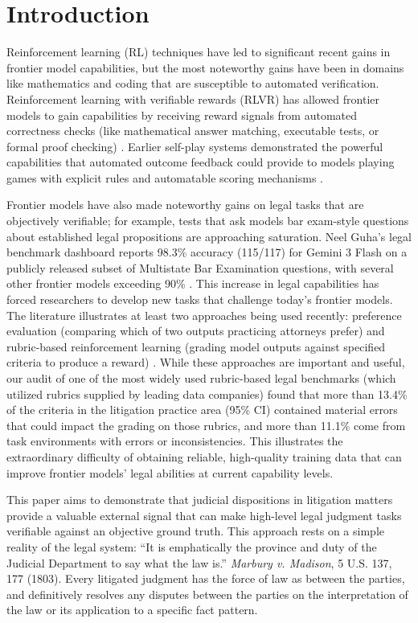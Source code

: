 \documentclass[11pt]{article}
\newcommand{\labDefectiveShare}{13.4}
\newcommand{\labEnvShare}{11.1}
\begin{document}
\section{Introduction}

Reinforcement learning (RL) techniques have led to significant recent gains in frontier model capabilities, but the most noteworthy gains have been in domains like mathematics and coding that are susceptible to automated verification. Reinforcement learning with verifiable rewards (RLVR) has allowed frontier models to gain capabilities by receiving reward signals from automated correctness checks (like mathematical answer matching, executable tests, or formal proof checking) \citep{deepseek,rlve}. Earlier self-play systems demonstrated the powerful capabilities that automated outcome feedback could provide to models playing games with explicit rules and automatable scoring mechanisms \citep{alphazero}.

Frontier models have also made noteworthy gains on legal tasks that are objectively verifiable; for example, tests that ask models bar exam-style questions about established legal propositions are approaching saturation. Neel Guha's legal benchmark dashboard reports 98.3\% accuracy (115/117) for Gemini 3 Flash on a publicly released subset of Multistate Bar Examination questions, with several other frontier models exceeding 90\% \citep{legalEval}. This increase in legal capabilities has forced researchers to develop new tasks that challenge today's frontier models. The literature illustrates at least two approaches being used recently: preference evaluation (comparing which of two outputs practicing attorneys prefer) and rubric-based reinforcement learning (grading model outputs against specified criteria to produce a reward) \citep{judgmentbench}. While these approaches are important and useful, our audit of one of the most widely used rubric-based legal benchmarks (which utilized rubrics supplied by leading data companies) found that more than \labDefectiveShare\% of the criteria in the litigation practice area (95\% CI) contained material errors that could impact the grading on those rubrics, and more than \labEnvShare\% come from task environments with errors or inconsistencies. This illustrates the extraordinary difficulty of obtaining reliable, high-quality training data that can improve frontier models' legal abilities at current capability levels.

This paper aims to demonstrate that judicial dispositions in litigation matters provide a valuable external signal that can make high-level legal judgment tasks verifiable against an objective ground truth. This approach rests on a simple reality of the legal system: ``It is emphatically the province and duty of the Judicial Department to say what the law is.'' \emph{Marbury v. Madison}, 5 U.S. 137, 177 (1803). Every litigated judgment has the force of law as between the parties, and definitively resolves any disputes between the parties on the interpretation of the law or its application to a specific fact pattern.
\end{document}
